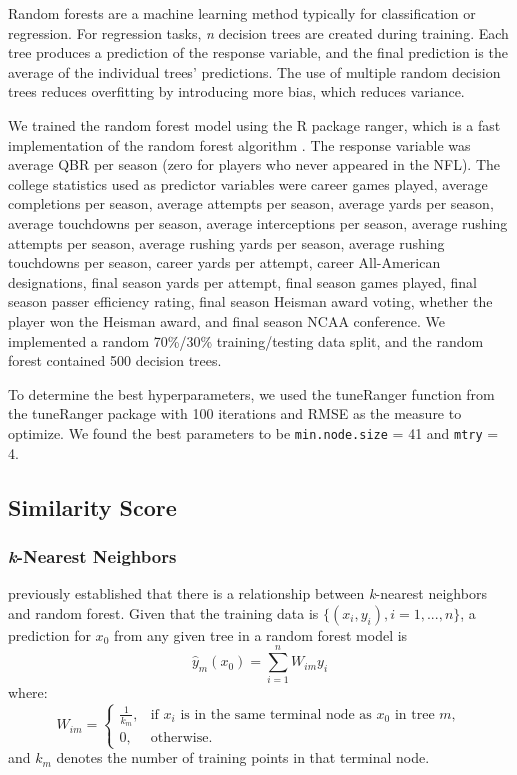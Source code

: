 \documentclass{article}
\begin{document}
Random forests are a machine learning method typically for classification or regression. For regression tasks, \textit{n} decision trees are created during training. Each tree produces a prediction of the response variable, and the final prediction is the average of the individual trees' predictions. The use of multiple random decision trees reduces overfitting by introducing more bias, which reduces variance.

We trained the random forest model using the R package ranger, which is a fast implementation of the random forest algorithm \citep{wright_ranger_2015}. The response variable was average QBR per season (zero for players who never appeared in the NFL). The college statistics used as predictor variables were career games played, average completions per season, average attempts per season, average yards per season, average touchdowns per season, average interceptions per season, average rushing attempts per season, average rushing yards per season, average rushing touchdowns per season, career yards per attempt, career All-American designations, final season yards per attempt, final season games played, final season passer efficiency rating, final season Heisman award voting, whether the player won the Heisman award, and final season NCAA conference. We implemented a random 70\%/30\% training/testing data split, and the random forest contained 500 decision trees.

To determine the best hyperparameters, we used the tuneRanger function from the tuneRanger package \citep{probst_tuneranger_2018} with 100 iterations and RMSE as the measure to optimize. We found the best parameters to be \texttt{min.node.size} = 41 and \texttt{mtry} = 4.

\subsection{Similarity Score}

\subsubsection{\textit{k}-Nearest Neighbors}

\citet{lin_random_2006} previously established that there is a relationship between \textit{k}-nearest neighbors and random forest. Given that the training data is $\{(x_i,y_i),i=1, ...,n\}$, a prediction for $x_0$ from any given tree in a random forest model is $$\hat{y}_m(x_0)=\sum_{i=1}^{n}W_{im}y_i$$
where:
\[W_{im} = 
\begin{cases}
\frac{1}{k_m}, & \text{if } x_i \text{ is in the same terminal node as } x_0 \text{ in tree } m, \\
0, & \text{otherwise}.
\end{cases} 
\]
and $k_m$ denotes the number of training points in that terminal node. 
\end{document}

